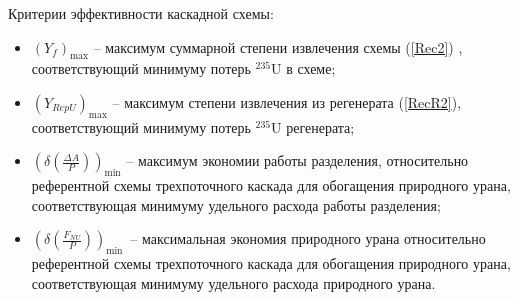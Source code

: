 Критерии эффективности каскадной схемы:
\begin{itemize}
    \item $(Y_f)_\text{max}$ -- максимум суммарной степени извлечения схемы (\ref{Rec2}) , соответствующий минимуму потерь $^{235}$U в схеме;
    \item $(Y_{RepU})_\text{max}$ -- максимум степени извлечения из регенерата (\ref{RecR2}), соответствующий минимуму потерь $^{235}$U регенерата;
    \item $(\delta(\frac{\Delta A}{P}))_\text{min}$ -- максимум экономии работы разделения, относительно референтной схемы трехпоточного каскада для обогащения природного урана, соответствующая минимуму удельного расхода работы разделения; 
    \item $(\delta(\frac{F_{NU}}{P}))_\text{min}$\ -- максимальная экономия природного урана относительно референтной схемы трехпоточного каскада для обогащения природного урана, соответствующая минимуму удельного расхода природного урана.
\end{itemize}\label{criteria_list}

